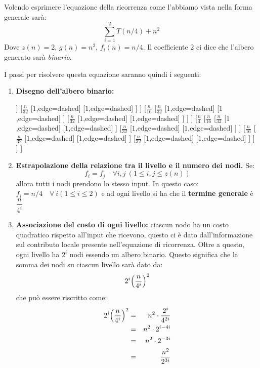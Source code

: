 Volendo esprimere l'equazione della ricorrenza come l'abbiamo vista nella forma generale sarà:
\begin{displaymath}
	\sum_{i=1}^{2}T(n/4) + n^{2}
\end{displaymath}
Dove $z(n)=2$, $g(n)=n^{2}$, $f_{i}(n)=n/4$. Il coefficiente 2 ci dice che l'albero generato sarà \textit{binario}.

I passi per risolvere questa equazione saranno quindi i seguenti:
\begin{enumerate}
	\item \textbf{Disegno dell'albero binario:}
	\begin{center}
\begin{forest}
	[$n$
		[$\frac{n}{4}$
			[$\frac{n}{16}$
				[$\frac{n}{32}$
					[$1$,edge=dashed]
					[$1$,edge=dashed]
				]
				[$\frac{n}{32}$
				[$1$,edge=dashed]
				[$1$,edge=dashed]
				]
			]
			[$\frac{n}{16}$
				[$\frac{n}{32}$
					[$1$,edge=dashed]
					[$1$,edge=dashed]
				]
				[$\frac{n}{32}$
				[$1$,edge=dashed]
				[$1$,edge=dashed]
				]
			]
		]
		[$\frac{n}{4}$
			[$\frac{n}{16}$
				[$\frac{n}{32}$
					[$1$,edge=dashed]
					[$1$,edge=dashed]
				]
				[$\frac{n}{32}$
				[$1$,edge=dashed]
				[$1$,edge=dashed]
				]
			]
			[$\frac{n}{16}$
				[$\frac{n}{32}$
					[$1$,edge=dashed]
					[$1$,edge=dashed]
				]
				[$\frac{n}{32}$
				[$1$,edge=dashed]
				[$1$,edge=dashed]
				]
			]
		]
	]
\end{forest}
	\end{center}
	\item \textbf{Estrapolazione della relazione tra il livello e il numero dei nodi.} Se: $$f_{i} = f_{j} \quad \forall i,j \ (1 \leq i, j \leq z(n))$$ allora tutti i nodi prendono lo stesso input. In questo caso: $f_{i}=n/4 \quad \forall \ i (1 \leq i \leq 2)$ e ad ogni livello si ha che il \textbf{termine generale} è $\dfrac{n}{4^{i}}$
	\item \textbf{Associazione del costo di ogni livello:} ciascun nodo ha un costo quadratico rispetto all'input che ricevono, questo ci è dato dall'informazione sul contributo locale presente nell'equazione di ricorrenza. Oltre a questo, ogni livello ha $2^{i}$ nodi essendo un albero binario. Questo significa che la somma dei nodi su ciascun livello sarà dato da:
	\begin{displaymath}
	2^{i}\Bigl(\frac{n}{4^{i}}\Bigl)^{2}
	\end{displaymath}
	che può essere riscritto come:
	\begin{eqnarray*}
	2^{i}\Bigl(\frac{n}{4^{i}}\Bigl)^{2} &=& n^{2} \cdot \frac{2^{i}}{4^{2i}} \\
	&=& n^{2} \cdot 2^{i-4i}\\
	&=& n^{2} \cdot 2^{-3i} \\
	&=& \frac{n^{2}}{2^{3i}}\\
	\end{eqnarray*}


\end{enumerate}
